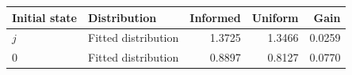 \begin{tabular}{llrrr}\toprule
Initial state & Distribution & Informed & Uniform & Gain\\\midrule
$j$ & Fitted distribution & 1.3725 & 1.3466 & 0.0259 \\
$0$ & Fitted distribution & 0.8897 & 0.8127 & 0.0770 \\
\bottomrule\end{tabular}
